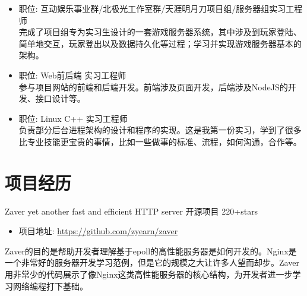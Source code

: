 \documentclass[11pt,a4paper]{moderncv}
\begin{document}
{
\begin{itemize}
\item 职位: 互动娱乐事业群/北极光工作室群/天涯明月刀项目组/服务器组实习工程师\\
完成了项目组专为实习生设计的一套游戏服务器系统，其中涉及到玩家登陆、简单地交互，玩家登出以及数据持久化等过程；学习并实现游戏服务器基本的架构。
\end{itemize}
}
\vspace*{0.4\baselineskip}

{
\begin{itemize}
\item 职位: Web前后端 实习工程师\\
参与项目网站的前端和后端开发。前端涉及页面开发，后端涉及NodeJS的开发、接口设计等。
\end{itemize}
}
\vspace*{0.4\baselineskip}

{
\begin{itemize}
\item 职位: Linux C++ 实习工程师\\
负责部分后台进程架构的设计和程序的实现。这是我第一份实习，学到了很多比专业技能更宝贵的事情，比如一些做事的标准、流程，如何沟通，合作等。
\end{itemize}
}
\vspace*{0.4\baselineskip}


\section{项目经历}
{Zaver}
{yet another fast and efficient HTTP server}
{开源项目}
{220+stars}
{
\begin{itemize}
    \item 项目地址: \url{https://github.com/zyearn/zaver}
\end{itemize}
Zaver的目的是帮助开发者理解基于epoll的高性能服务器是如何开发的。Nginx是一个非常好的服务器开发学习范例，但是它的规模之大让许多人望而却步。Zaver用非常少的代码展示了像Nginx这类高性能服务器的核心结构，为开发者进一步学习网络编程打下基础。
}
\vspace*{0.4\baselineskip}
\end{document}
